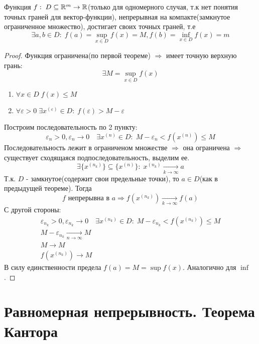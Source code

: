 \newpage
\begin{theorem}
    Функция $f:\; D \subseteq \mathbb{R}^m \rightarrow \mathbb{R}$(только для одномерного случая, т.к нет понятия точных граней для вектор-функции), 
    непрерывная на компакте(замкнутое ограниченное множество), достигает своих точных граней, т.е
    \[\exists a, b \in D:\; f(a)=\sup_{x\in D}{f(x)} =M , f(b)=\inf_{x\in D}{f(x)}=m \]
\end{theorem}

\begin{proof}
    Функция ограничена(по первой теореме) $\Rightarrow$ имеет точную верхную грань: 
    \[\exists M = \sup_{x\in D}{f(x)}\]
    \begin{enumerate}
        \item $\forall x \in D\; f(x) \leqslant M$
        \item $\forall \varepsilon > 0\; \exists x^{(\varepsilon)} \in D:\; f(\varepsilon) > M - \varepsilon$
    \end{enumerate}
    Построим последовательность по 2 пункту:
    \[
        \varepsilon_n > 0, \varepsilon_n \rightarrow 0 \quad \exists x^{(n)} \in D:\; M-\varepsilon_n < f(x^{(n)}) \leqslant M
    \]
    Последовательность лежит в ограниченом множестве $\Rightarrow$ она ограничена $\Rightarrow$ 
        существует сходящаяся подпоследовательность, выделим ее. 
    \[
        \exists \{x^{(n_k)}\} \subseteq \{x^{(n)}\}:\; x^{(n_k)} \xrightarrow[k \rightarrow \infty]{} a
    \]
    Т.к. $D$ - замкнутое(содержит свои предельные точки), то $a \in D$(как в предыдущей теореме). Тогда
    \[
        f \text{ непрерывна в } a \Rightarrow f(x^{(n_k)}) \xrightarrow[k \rightarrow \infty]{} f(a)
    \]
    С другой стороны:
    \begin{gather*}
        \varepsilon_{n_k} > 0, \varepsilon_{n_k} \rightarrow 0 \quad \exists x^{(n_k)} \in D:\; M-\varepsilon_{n_k} < f(x^{(n_k)}) \leqslant M\\
        M-\varepsilon_{n_k} \xrightarrow[n \rightarrow \infty]{} M\\
        M \rightarrow M\\
        f(x^{(n_k)}) \rightarrow M
    \end{gather*}
    В силу единственности предела $f(a) = M =\sup{f(x)}$. Аналогично для $\inf$.
\end{proof}

\newpage
\section{Равномерная непрерывность. Теорема Кантора}

